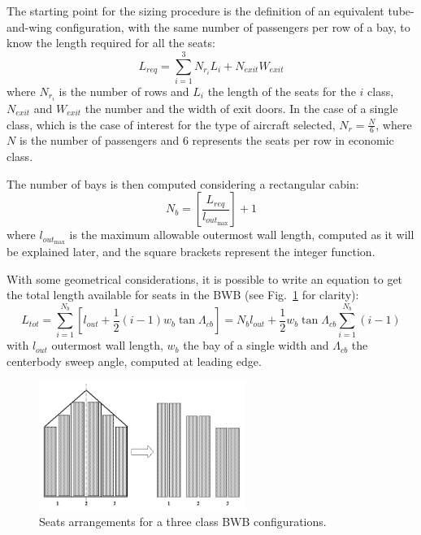 The starting point for the sizing procedure is the definition of an equivalent tube-and-wing configuration, with the same number of passengers per row of a bay, to know the length required for all the seats:
\begin{equation}
\label{eq:taw_eq_length}
L_{req}=\sum_{i=1}^{3}N_{r_{i}}L_{i} + N_{exit}W_{exit}
\end{equation}
where $N_{r_{i}}$ is the number of rows and $L_i$ the length of the seats for the $i$ class, $N_{exit}$ and $W_{exit}$ the number and the width of exit doors. 
In the case of a single class, which is the case of interest for the type of aircraft selected, $N_r=\frac{N}{6}$, where $N$ is the number of passengers and 6 represents the seats per row in economic class.

The number of bays is then computed considering a rectangular cabin:
\begin{equation}
\label{eq:bays_number}
N_b=\left[\frac{L_{req}}{l_{out_{\max}}}\right]+1
\end{equation}
where $l_{out_{\max}}$ is the maximum allowable outermost wall length, computed as it will be explained later, and the square brackets represent the integer function.

With some geometrical considerations, it is possible to write an equation to get the total length available for seats in the BWB (see Fig.~\ref{fig:bradley_seats_arrangement} for clarity):
\begin{equation}
\label{eq:bwb_total_length}
L_{tot} = \sum_{i=1}^{N_b}\left[l_{out} + \frac{1}{2}\left(i-1\right)w_b\tan\Lambda_{cb}\right] = N_bl_{out} + \frac{1}{2}w_b\tan\Lambda_{cb}\sum_{i=1}^{N_b}\left(i-1\right)
\end{equation}
with $l_{out}$ outermost wall length, $w_b$ the bay of a single width and $\Lambda_{cb}$ the centerbody sweep angle, computed at leading edge. 
\begin{figure}[!h]
	\centering
	\includegraphics[width=0.6\textwidth, keepaspectratio]{images/chap4/bwb_bradley_equivalent_bay.jpg}
	\caption{Seats arrangements for a three class BWB configurations.}
	\label{fig:bradley_seats_arrangement}		
\end{figure}

